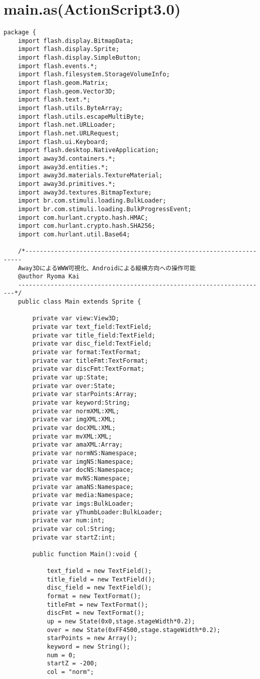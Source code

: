\section{main.as(ActionScript3.0)}
{\scriptsize
\begin{verbatim}
package {
	import flash.display.BitmapData;
	import flash.display.Sprite;
	import flash.display.SimpleButton;
	import flash.events.*;
	import flash.filesystem.StorageVolumeInfo;
	import flash.geom.Matrix;
	import flash.geom.Vector3D;
	import flash.text.*;
	import flash.utils.ByteArray;
	import flash.utils.escapeMultiByte;
	import flash.net.URLLoader;
	import flash.net.URLRequest;
	import flash.ui.Keyboard;
	import flash.desktop.NativeApplication;
	import away3d.containers.*;
	import away3d.entities.*;
	import away3d.materials.TextureMaterial;
	import away3d.primitives.*;
	import away3d.textures.BitmapTexture;
	import br.com.stimuli.loading.BulkLoader;
	import br.com.stimuli.loading.BulkProgressEvent;
	import com.hurlant.crypto.hash.HMAC;
	import com.hurlant.crypto.hash.SHA256;
	import com.hurlant.util.Base64;

	/*---------------------------------------------------------------------
	Away3DによるWWW可視化、Androidによる縦横方向への操作可能
	@author Ryoma Kai
	---------------------------------------------------------------------*/
	public class Main extends Sprite {
		
		private var view:View3D;
		private var text_field:TextField;
		private var title_field:TextField;
		private var disc_field:TextField;
		private var format:TextFormat;
		private var titleFmt:TextFormat;
		private var discFmt:TextFormat;
		private var up:State;
		private var over:State;
		private var starPoints:Array;
		private var keyword:String;
		private var normXML:XML;
		private var imgXML:XML;
		private var docXML:XML;
		private var mvXML:XML;
		private var amaXML:Array;
		private var normNS:Namespace;
		private var imgNS:Namespace;
		private var docNS:Namespace;
		private var mvNS:Namespace;
		private var amaNS:Namespace;
		private var media:Namespace;
		private var imgs:BulkLoader;
		private var yThumbLoader:BulkLoader;
		private var num:int;
		private var col:String;
		private var startZ:int;
		
		public function Main():void {
			
			text_field = new TextField();
			title_field = new TextField();
			disc_field = new TextField();
			format = new TextFormat();
			titleFmt = new TextFormat();
			discFmt = new TextFormat();
			up = new State(0x0,stage.stageWidth*0.2);
			over = new State(0xFF4500,stage.stageWidth*0.2);
			starPoints = new Array();
			keyword = new String();
			num = 0;
			startZ = -200;
			col = "norm";
			

\end{verbatim}}
